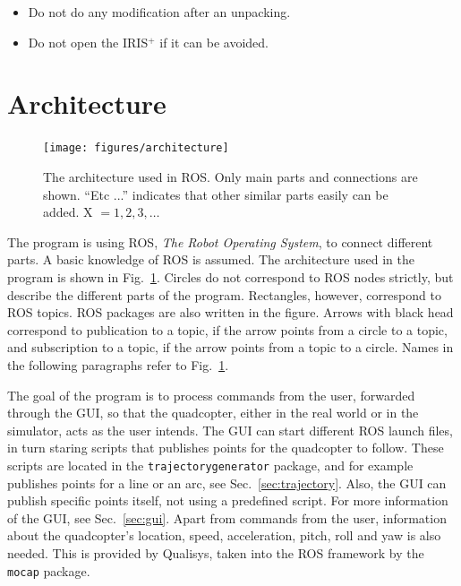 \documentclass[titlepage,11pt,a4paper]{article}
\begin{document}
\begin{itemize}
  \item Do not do any modification after an unpacking.
  \item Do not open the IRIS$^+$ if it can be avoided.
\end{itemize}


\section{Architecture}
\label{sec:architecture}

\begin{figure}[h!]                                                               
  \centering \texttt{[image: figures/architecture]}
  \caption{The architecture used in ROS. Only main parts and
    connections are shown. ``Etc ...'' indicates that other similar
    parts easily can be added. X $= 1, 2, 3, \dots$}
  \label{fig:architecture}                                                              
\end{figure}

The program is using ROS, \textit{The Robot Operating System}, to
connect different parts. A basic knowledge of ROS is
assumed. The architecture used in the program is shown in
Fig.~\ref{fig:architecture}. Circles do not correspond to ROS nodes
strictly, but describe the different parts of the
program. Rectangles, however, correspond to ROS topics. ROS packages
are also written in the figure. Arrows with black head correspond to
publication to a topic, if the arrow points from a circle to a topic,
and subscription to a topic, if the arrow points from a topic to a
circle. Names in the following paragraphs refer to
Fig.~\ref{fig:architecture}.

The goal of the program is to process commands from the user,
forwarded through the GUI, so that the quadcopter, either in the real
world or in the simulator, acts as the user intends. The GUI can start
different ROS launch files, in turn staring scripts that publishes
points for the quadcopter to follow. These scripts are located in the
\texttt{trajectory\textunderscore generator} package, and for example
publishes points for a line or an arc, see
Sec.~\ref{sec:trajectory}. Also, the GUI can publish specific points
itself, not using a predefined script. For more information of the
GUI, see Sec.~\ref{sec:gui}. Apart from commands from the user,
information about the quadcopter's location, speed, acceleration,
pitch, roll and yaw is also needed. This is provided by Qualisys,
taken into the ROS framework by the \texttt{mocap} package.
\end{document}
